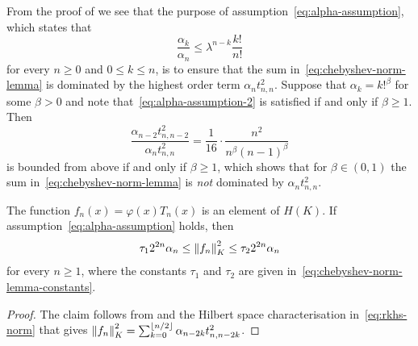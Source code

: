 \documentclass{mcom-l}
\numberwithin{equation}{section}
\numberwithin{theorem}{section} %
\DeclarePairedDelimiter{\floor}{\lfloor}{\rfloor}         %
\begin{document}
\begin{remark} \label{rmk:alpha-assumption-unif}
From the proof of  we see that the purpose of assumption~\eqref{eq:alpha-assumption}, which states that
\begin{equation} \label{eq:alpha-assumption-2}
  \frac{\alpha_{k}}{\alpha_n} \leq \lambda^{n-k} \frac{k!}{n!}
\end{equation}
for every $n \geq 0$ and $0 \leq k \leq n$, is to ensure that the sum in~\eqref{eq:chebyshev-norm-lemma} is dominated by the highest order term $\alpha_{n} t_{n, n}^2$.
Suppose that $\alpha_k = k!^\beta$ for some $\beta > 0$ and note that~\eqref{eq:alpha-assumption-2} is satisfied if and only if $\beta \geq 1$.
Then
\begin{equation*}
  \frac{\alpha_{n - 2} t_{n, n - 2}^2}{\alpha_n t_{n, n}^2} = \frac{1}{16} \cdot \frac{n^2}{n^\beta (n-1)^\beta}
\end{equation*}
is bounded from above if and only if $\beta \geq 1$, which shows that for $\beta \in (0, 1)$ the sum in~\eqref{eq:chebyshev-norm-lemma} is \emph{not} dominated by $\alpha_{n} t_{n, n}^2$.
\end{remark}

\begin{lemma}
  \label{lemma:chebyshev-norm-bound}
  The function $f_n(x) = \varphi(x) T_n(x)$ is an element of $H(K)$.
  If assumption~\eqref{eq:alpha-assumption} holds, then
  \begin{equation*}
    \tau_1 2^{2n} \alpha_n \leq \norm[0]{f_n}_K^2 \leq \tau_2 2^{2n} \alpha_n
  \end{equation*}
  for every $n \geq 1$, where the constants $\tau_1$ and $\tau_2$ are given in~\eqref{eq:chebyshev-norm-lemma-constants}.
\end{lemma}
\begin{proof}
  The claim follows from  and the Hilbert space characterisation in~\eqref{eq:rkhs-norm} that gives $\norm[0]{f_n}_K^2 = \sum_{k=0}^{\floor{n/2}} \alpha_{n-2k} t_{n, n - 2k}^2$.
\end{proof}
\end{document}
